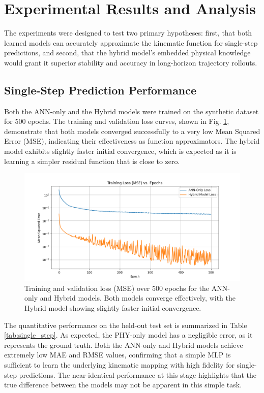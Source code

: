 \documentclass[conference]{IEEEtran}
\begin{document}
\section{Experimental Results and Analysis}
The experiments were designed to test two primary hypotheses: first, that both learned models can accurately approximate the kinematic function for single-step predictions, and second, that the hybrid model's embedded physical knowledge would grant it superior stability and accuracy in long-horizon trajectory rollouts.

\subsection{Single-Step Prediction Performance}
Both the ANN-only and the Hybrid models were trained on the synthetic dataset for 500 epochs. The training and validation loss curves, shown in Fig. \ref{fig:loss}, demonstrate that both models converged successfully to a very low Mean Squared Error (MSE), indicating their effectiveness as function approximators. The hybrid model exhibits slightly faster initial convergence, which is expected as it is learning a simpler residual function that is close to zero.

\begin{figure}[htbp]
\centerline{\includegraphics[width=\columnwidth]{figure2.png}}
\caption{Training and validation loss (MSE) over 500 epochs for the ANN-only and Hybrid models. Both models converge effectively, with the Hybrid model showing slightly faster initial convergence.}
\label{fig:loss}
\end{figure}

The quantitative performance on the held-out test set is summarized in Table \ref{tab:single_step}. As expected, the PHY-only model has a negligible error, as it represents the ground truth. Both the ANN-only and Hybrid models achieve extremely low MAE and RMSE values, confirming that a simple MLP is sufficient to learn the underlying kinematic mapping with high fidelity for single-step predictions. The near-identical performance at this stage highlights that the true difference between the models may not be apparent in this simple task.
\end{document}
